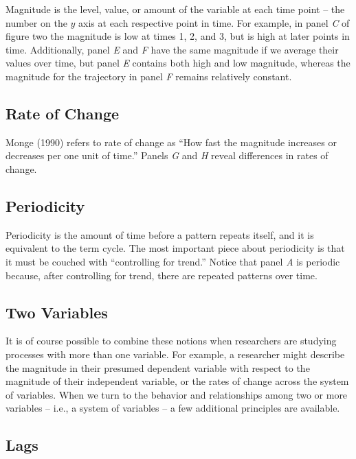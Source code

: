 \documentclass[english,,man]{apa6}
\theoremstyle{definition}
\theoremstyle{definition}
\theoremstyle{definition}
\theoremstyle{remark}
\begin{document}
Magnitude is the level, value, or amount of the variable at each time
point -- the number on the \(y\) axis at each respective point in time.
For example, in panel \emph{C} of figure two the magnitude is low at
times 1, 2, and 3, but is high at later points in time. Additionally,
panel \emph{E} and \emph{F} have the same magnitude if we average their
values over time, but panel \emph{E} contains both high and low
magnitude, whereas the magnitude for the trajectory in panel \emph{F}
remains relatively constant.

\hypertarget{rate-of-change}{%
\subsection{Rate of Change}\label{rate-of-change}}

Monge (1990) refers to rate of change as \enquote{How fast the magnitude
increases or decreases per one unit of time.} Panels \emph{G} and
\emph{H} reveal differences in rates of change.

\hypertarget{periodicity}{%
\subsection{Periodicity}\label{periodicity}}

Periodicity is the amount of time before a pattern repeats itself, and
it is equivalent to the term cycle. The most important piece about
periodicity is that it must be couched with \enquote{controlling for
trend.} Notice that panel \emph{A} is periodic because, after
controlling for trend, there are repeated patterns over time.

\hypertarget{two-variables}{%
\subsection{Two Variables}\label{two-variables}}

It is of course possible to combine these notions when researchers are
studying processes with more than one variable. For example, a
researcher might describe the magnitude in their presumed dependent
variable with respect to the magnitude of their independent variable, or
the rates of change across the system of variables. When we turn to the
behavior and relationships among two or more variables -- i.e., a system
of variables -- a few additional principles are available.

\hypertarget{lags}{%
\subsection{Lags}\label{lags}}
\end{document}
